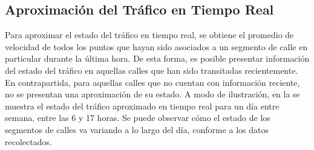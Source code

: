 \subsection{Aproximación del Tráfico en Tiempo Real}

Para aproximar el estado del tráfico en tiempo real, se obtiene el promedio de velocidad de todos los puntos que hayan sido asociados a un segmento de calle en particular durante la última hora. De esta forma, es posible presentar información del estado del tráfico en aquellas calles que han sido transitadas recientemente. En contrapartida, para aquellas calles que no cuentan con información reciente, no se presentan una aproximación de su estado. A modo de ilustración, en la  se muestra el estado del tráfico aproximado en tiempo real para un día entre semana, entre las 6 y 17 horas. Se puede observar cómo el estado de los segmentos de calles va variando a lo largo del día, conforme a los datos recolectados.

